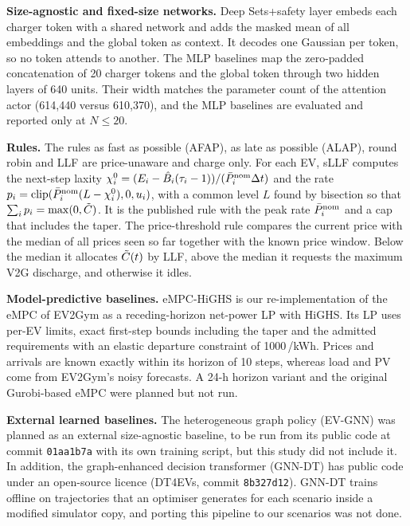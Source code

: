 \textbf{Size-agnostic and fixed-size networks.}
Deep Sets+safety layer embeds each charger token with a shared network and adds the masked mean of all embeddings and the global token as context.
It decodes one Gaussian per token, so no token attends to another.
The MLP baselines map the zero-padded concatenation of 20 charger tokens and the global token through two hidden layers of 640 units.
Their width matches the parameter count of the attention actor (614,440 versus 610,370), and the MLP baselines are evaluated and reported only at $N\le20$.


\textbf{Rules.}
The rules as fast as possible (AFAP), as late as possible (ALAP), round robin and LLF are price-unaware and charge only.
For each EV, sLLF \cite{chen2022smoothed} computes the next-step laxity $\chi_i^0=(E_i-\hat B_i(\tau_i-1))/(\bar P^{\mathrm{nom}}_i\Delta t)$ and the rate $p_i=\operatorname{clip}(\bar P^{\mathrm{nom}}_i(L-\chi_i^0),0,u_i)$, with a common level $L$ found by bisection so that $\sum_ip_i=\max(0,\tilde C)$.
It is the published rule with the peak rate $\bar P^{\mathrm{nom}}_i$ and a cap that includes the taper.
The price-threshold rule compares the current price with the median of all prices seen so far together with the known price window.
Below the median it allocates $\tilde C(t)$ by LLF, above the median it requests the maximum V2G discharge, and otherwise it idles.

\textbf{Model-predictive baselines.}
eMPC-HiGHS is our re-implementation of the eMPC of EV2Gym \cite{diazlondono2026open} as a receding-horizon net-power LP with HiGHS.
Its LP uses per-EV limits, exact first-step bounds including the taper and the admitted requirements with an elastic departure constraint of 1000\,\texteuro/kWh.
Prices and arrivals are known exactly within its horizon of 10 steps, whereas load and PV come from EV2Gym's noisy forecasts.
A 24-h horizon variant and the original Gurobi-based eMPC were planned but not run.

\textbf{External learned baselines.}
The heterogeneous graph policy (EV-GNN) \cite{orfanoudakis2025scalable} was planned as an external size-agnostic baseline, to be run from its public code at commit \texttt{01aa1b7a} with its own training script, but this study did not include it.
In addition, the graph-enhanced decision transformer (GNN-DT) \cite{orfanoudakis2026graph} has public code under an open-source licence (DT4EVs, commit \texttt{8b327d12}).
GNN-DT trains offline on trajectories that an optimiser generates for each scenario inside a modified simulator copy, and porting this pipeline to our scenarios was not done.

